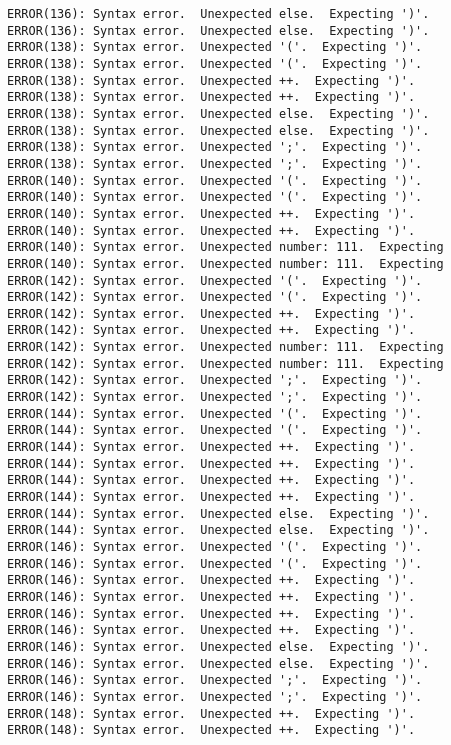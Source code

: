 \documentclass[12pt]{book}
\begin{document}
\begin{lstlisting}
ERROR(136): Syntax error.  Unexpected else.  Expecting ')'.	ERROR(136): Syntax error.  Unexpected else.  Expecting ')'.
ERROR(138): Syntax error.  Unexpected '('.  Expecting ')'.	ERROR(138): Syntax error.  Unexpected '('.  Expecting ')'.
ERROR(138): Syntax error.  Unexpected ++.  Expecting ')'.	ERROR(138): Syntax error.  Unexpected ++.  Expecting ')'.
ERROR(138): Syntax error.  Unexpected else.  Expecting ')'.	ERROR(138): Syntax error.  Unexpected else.  Expecting ')'.
ERROR(138): Syntax error.  Unexpected ';'.  Expecting ')'.	ERROR(138): Syntax error.  Unexpected ';'.  Expecting ')'.
ERROR(140): Syntax error.  Unexpected '('.  Expecting ')'.	ERROR(140): Syntax error.  Unexpected '('.  Expecting ')'.
ERROR(140): Syntax error.  Unexpected ++.  Expecting ')'.	ERROR(140): Syntax error.  Unexpected ++.  Expecting ')'.
ERROR(140): Syntax error.  Unexpected number: 111.  Expecting	ERROR(140): Syntax error.  Unexpected number: 111.  Expecting
ERROR(142): Syntax error.  Unexpected '('.  Expecting ')'.	ERROR(142): Syntax error.  Unexpected '('.  Expecting ')'.
ERROR(142): Syntax error.  Unexpected ++.  Expecting ')'.	ERROR(142): Syntax error.  Unexpected ++.  Expecting ')'.
ERROR(142): Syntax error.  Unexpected number: 111.  Expecting	ERROR(142): Syntax error.  Unexpected number: 111.  Expecting
ERROR(142): Syntax error.  Unexpected ';'.  Expecting ')'.	ERROR(142): Syntax error.  Unexpected ';'.  Expecting ')'.
ERROR(144): Syntax error.  Unexpected '('.  Expecting ')'.	ERROR(144): Syntax error.  Unexpected '('.  Expecting ')'.
ERROR(144): Syntax error.  Unexpected ++.  Expecting ')'.	ERROR(144): Syntax error.  Unexpected ++.  Expecting ')'.
ERROR(144): Syntax error.  Unexpected ++.  Expecting ')'.	ERROR(144): Syntax error.  Unexpected ++.  Expecting ')'.
ERROR(144): Syntax error.  Unexpected else.  Expecting ')'.	ERROR(144): Syntax error.  Unexpected else.  Expecting ')'.
ERROR(146): Syntax error.  Unexpected '('.  Expecting ')'.	ERROR(146): Syntax error.  Unexpected '('.  Expecting ')'.
ERROR(146): Syntax error.  Unexpected ++.  Expecting ')'.	ERROR(146): Syntax error.  Unexpected ++.  Expecting ')'.
ERROR(146): Syntax error.  Unexpected ++.  Expecting ')'.	ERROR(146): Syntax error.  Unexpected ++.  Expecting ')'.
ERROR(146): Syntax error.  Unexpected else.  Expecting ')'.	ERROR(146): Syntax error.  Unexpected else.  Expecting ')'.
ERROR(146): Syntax error.  Unexpected ';'.  Expecting ')'.	ERROR(146): Syntax error.  Unexpected ';'.  Expecting ')'.
ERROR(148): Syntax error.  Unexpected ++.  Expecting ')'.	ERROR(148): Syntax error.  Unexpected ++.  Expecting ')'.

\end{lstlisting}
\end{document}
